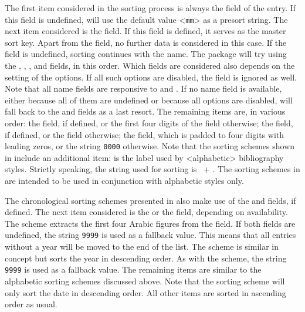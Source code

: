 The first item considered in the sorting process is always the  field of the entry. If this field is undefined, \biblatex will use the default value <\texttt{mm}> as a presort string. The next item considered is the  field. If this field is defined, it serves as the master sort key. Apart from the  field, no further data is considered in this case. If the  field is undefined, sorting continues with the name. The package will try using the , , , and  fields, in this order. Which fields are considered also depends on the setting of the  options. If all such options are disabled, the  field is ignored as well. Note that all name fields are responsive to  and . If no name field is available, either because all of them are undefined or because all  options are disabled, \biblatex will fall back to the  and  fields as a last resort. The remaining items are, in various order: the  field, if defined, or the first four digits of the  field otherwise; the  field, if defined, or the  field otherwise; the  field, which is padded to four digits with leading zeros, or the string \texttt{0000} otherwise. Note that the sorting schemes shown in  include an additional item:  is the label used by <alphabetic> bibliography styles. Strictly speaking, the string used for sorting is ~+ . The sorting schemes in  are intended to be used in conjunction with alphabetic styles only.

The chronological sorting schemes presented in  also make use of the  and  fields, if defined. The next item considered is the  or the  field, depending on availability. The  scheme extracts the first four Arabic figures from the field. If both fields are undefined, the string \texttt{9999} is used as a fallback value. This means that all entries without a year will be moved to the end of the list. The  scheme is similar in concept but sorts the year in descending order. As with the  scheme, the string \texttt{9999} is used as a fallback value. The remaining items are similar to the alphabetic sorting schemes discussed above. Note that the  sorting scheme will only sort the date in descending order. All other items are sorted in ascending order as usual.


